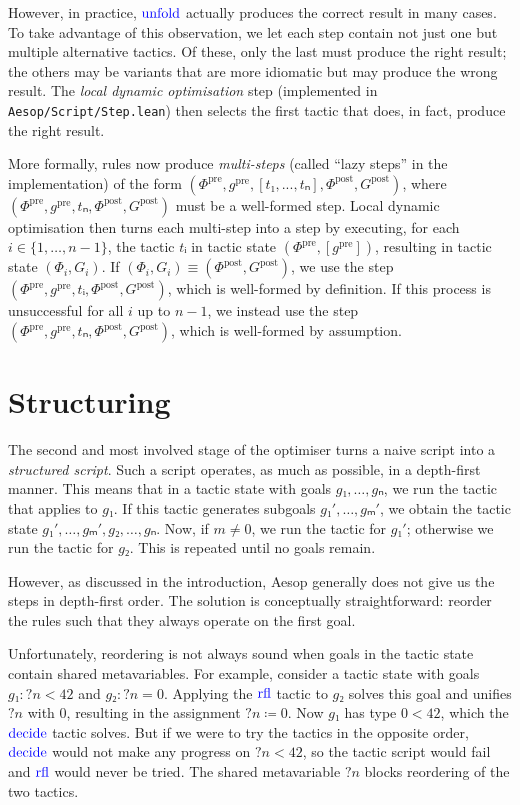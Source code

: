 \documentclass[sigplan,10pt,anonymous,review]{acmart}
\newcommand{\tac}[1]{\ensuremath{\mathrm{\mathcolor{blue}{#1}}}}
\newcommand{\mvar}[1]{{?#1}}
\newcommand{\pre}{\mathrm{pre}}
\newcommand{\post}{\mathrm{post}}
\newcommand{\step}[5]{\ensuremath{(#1,\allowbreak #2,\allowbreak #3,\allowbreak #4,\allowbreak #5)}}
\begin{document}
However, in practice, \tac{unfold} actually produces the correct result in many cases.
To take advantage of this observation, we let each step contain not just one but multiple alternative tactics.
Of these, only the last must produce the right result; the others may be variants that are more idiomatic but may produce the wrong result.
The \emph{local dynamic optimisation} step (implemented in \texttt{Aesop/Script/Step.lean}) then selects the first tactic that does, in fact, produce the right result.

More formally, rules now produce \emph{multi-steps} (called \enquote{lazy steps} in the implementation) of the form $\step{Φ^{\pre}}{g^{\pre}}{[t₁, ..., tₙ]}{Φ^{\post}}{G^{\post}}$, where $\step{Φ^{\pre}}{g^{\pre}}{tₙ}{Φ^{\post}}{G^{\post}}$ must be a well-formed step.
Local dynamic optimisation then turns each multi-step into a step by executing, for each $i ∈ \{1, \dots, n-1\}$, the tactic $tᵢ$ in tactic state $(Φ^{\pre}, [g^{\pre}])$, resulting in tactic state $(Φ_{i}, G_{i})$.
If $(Φ_{i}, G_{i}) ≡ (Φ^{\post}, G^{\post})$, we use the step $(Φ^{\pre}, g^{\pre}, tᵢ, Φ^{\post}, G^{\post})$, which is well-formed by definition.
If this process is unsuccessful for all $i$ up to $n-1$, we instead use the step $(Φ^{\pre}, g^{\pre}, tₙ, Φ^{\post}, G^{\post})$, which is well-formed by assumption.

\section{Structuring}%
\label{sec:structuring}

The second and most involved stage of the optimiser turns a naive script into a \emph{structured script}.
Such a script operates, as much as possible, in a depth-first manner.
This means that in a tactic state with goals $g₁, \dots, gₙ$, we run the tactic that applies to $g₁$.
If this tactic generates subgoals $g₁', \dots, gₘ'$, we obtain the tactic state $g₁', \dots, gₘ', g₂, \dots, gₙ$.
Now, if $m ≠ 0$, we run the tactic for $g₁'$; otherwise we run the tactic for $g₂$.
This is repeated until no goals remain.

However, as discussed in the introduction, Aesop generally does not give us the steps in depth-first order.
The solution is conceptually straightforward: reorder the rules such that they always operate on the first goal.

Unfortunately, reordering is not always sound when goals in the tactic state contain shared metavariables.
For example, consider a tactic state with goals $g₁ : \mvar{n} < 42$ and $g₂ : \mvar{n} = 0$.
Applying the \tac{rfl} tactic to $g₂$ solves this goal and unifies $\mvar{n}$ with $0$, resulting in the assignment $\mvar{n} ≔ 0$.
Now $g₁$ has type $0 < 42$, which the \tac{decide} tactic solves.
But if we were to try the tactics in the opposite order, \tac{decide} would not make any progress on $\mvar{n} < 42$, so the tactic script would fail and \tac{rfl} would never be tried.
The shared metavariable $\mvar{n}$ blocks reordering of the two tactics.
\end{document}
